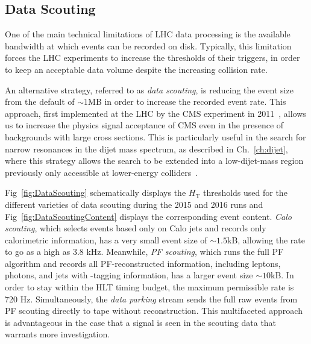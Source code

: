 \subsection{Data Scouting}
\label{sec:scouting}

One of the main technical limitations of LHC data processing is the available bandwidth at which events can be
recorded on disk. Typically, this limitation forces the LHC experiments to increase the thresholds of their
triggers, in order to keep an acceptable data volume despite the increasing collision rate. 

An alternative strategy, referred to as \emph{data scouting}, is reducing the
event size from the default of $\sim 1$\unit{MB} in order to increase the recorded event rate. This
approach, first implemented at the LHC by the CMS experiment in
2011~\cite{CMS-DP-2012-022}, allows us to increase the physics signal
acceptance of CMS even in the presence of backgrounds with large cross
sections. This is particularly useful in the search for
narrow resonances in the dijet mass spectrum, as described in Ch.~\ref{ch:dijet}, where this strategy allows the search to
be extended into a low-dijet-mass region previously only accessible at
lower-energy colliders~\cite{Khachatryan:2016ecr,CMS-PAS-EXO-16-032}.

Fig~\ref{fig:DataScouting} schematically displays the $H_{\mathrm{T}}$
thresholds used for the different varieties of data scouting during the
2015 and 2016 runs and Fig~\ref{fig:DataScoutingContent} displays the
corresponding event content. \emph{Calo scouting}, which selects
events based only on Calo jets and records only calorimetric
information, has a very small event size of $\sim 1.5$\unit{kB}, allowing the
rate to go as a high as 3.8 \unit{kHz}. Meanwhile, \emph{PF scouting},
which runs the full PF algorithm and records all PF-reconstructed
information, including leptons, photons, and jets with \cPqb-tagging
information, has a larger event size $\sim 10$\unit{kB}. In order to stay within the
HLT timing budget, the maximum permissible rate is 720 \unit{Hz}. Simultaneously, the \emph{data parking} stream sends the
full raw events from PF scouting directly to tape without reconstruction. This
multifaceted approach is advantageous in the case that a signal is
seen in the scouting data that warrants more investigation.


